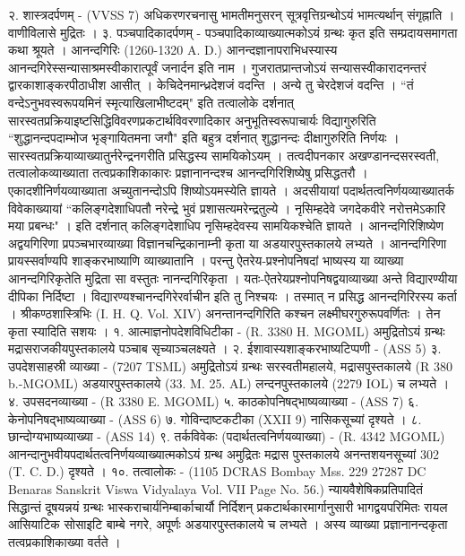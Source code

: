 २. शास्त्रदर्पणम् - (VVSS 7)
अधिकरणरचनासु भामतीमनुसरन् सूत्रवृत्तिग्रन्थोऽयं भामत्यर्थान् संगृह्नाति । वाणीविलासे मुद्रितः ।
३. पञ्चपादिकादर्पणम् - पञ्चपादिकाव्याख्यात्मकोऽयं ग्रन्थः कृत इति सम्प्रदायसमागता कथा श्रूयते ।
आनन्दगिरिः (1260-1320 A. D.)
आनन्दज्ञानापराभिधस्यास्य आनन्दगिरेस्सन्यासाश्रमस्वीकारात्पूर्वं जनार्दन इति नाम । गुजरातप्रान्तजोऽयं सन्यासस्वीकारादनन्तरं द्वारकाशाङ्करपीठाधीश आसीत् । केचिदेनमान्ध्रदेशजं वदन्ति । अन्ये तु चेरदेशजं वदन्ति ।
``तं वन्देऽनुभवस्वरूपयमिनं स्मृत्याखिलाभीष्टदम्" इति तत्वालोके दर्शनात् सारस्वतप्रक्रियाइष्टसिद्धिविवरणप्रकटार्थविवरणादिकार अनुभूतिस्वरूपाचार्यः विद्यागुरुरिति ``शुद्धानन्दपदाम्भोज भृङ्गायितमना जगौ" इति बहुत्र दर्शनात् शुद्धानन्दः दीक्षागुरुरिति निर्णयः ।
सारस्वतप्रक्रियाव्याख्यातुर्नरेन्द्रनगरीति प्रसिद्धस्य सामयिकोऽयम् । तत्वदीपनकार अखण्डानन्दसरस्वती, तत्वालोकव्याख्याता तत्वप्रकाशिकाकारः प्रज्ञानानन्दश्च आनन्दगिरिशिष्येषु प्रसिद्धतरौ । एकादशीनिर्णयव्याख्याता अच्युतानन्दोऽपि शिष्योऽयमस्येति ज्ञायते । अदसीयायां पदार्थतत्वनिर्णयव्याख्यातर्क विवेकाख्यायां ``कलिङ्गदेशाधिपतौ नरेन्द्रे भुवं प्रशासत्यमरेन्द्रतुल्ये । नृसिम्हदेवे जगदेकवीरे नरोत्तमेऽकारि मया प्रबन्धः" । इति दर्शनात् कलिङ्गदेशाधिप नृसिम्हदेवस्य सामयिकश्चेति ज्ञायते ।
आनन्दगिरिशिष्येण अद्वयगिरिणा प्रपञ्चभारव्याख्या विज्ञानचन्द्रिकानाम्नी कृता या अडयारपुस्तकालये लभ्यते ।
आनन्दगिरिणा प्रायस्सर्वाण्यपि शाङ्करभाष्याणि व्याख्यातानि । परन्तु ऐतरेय-प्रश्नोपनिषदां भाष्यस्य या व्याख्या आनन्दगिरिकृतेति मुद्रिता सा वस्तुतः नानन्दगिरिकृता । यतः-ऐतरेयप्रश्नोपनिषद्वयाव्याख्या अन्ते विद्यारण्यीया दीपिका निर्दिष्टा । विद्यारण्यश्चानन्दगिरेरर्वाचीन इति तु निश्चयः । तस्मात् न प्रसिद्ध आनन्दगिरिरस्य कर्ता । श्रीकण्ठशास्त्रिभिः (I. H. Q. Vol. XIV) अनन्तानन्दगिरिति कश्चन लक्ष्मीघरगुरुरूपवर्णितः । तेन कृता स्यादिति सशयः ।
१. आत्माज्ञनोपदेशविधिटीका - (R. 3380 H. MGOML) अमुद्रितोऽयं ग्रन्थः मद्रासराजकीयपुस्तकालये पञ्चाब सृच्याञ्चलक्ष्यते ।
२. ईशावास्यशाङ्करभाष्यटिप्पणी - (ASS 5)
३. उपदेशसाहस्री व्याख्या - (7207 TSML)
अमुद्रितोऽयं ग्रन्थः सरस्वतीमहालये, मद्रासपुस्तकालये (R 380 b.-MGOML) अडयारपुस्तकालये (33. M. 25. AL) लन्दनपुस्तकालये (2279 IOL) च लभ्यते ।
४. उपसदनव्याख्या - (R 3380 E. MGOML)
५. काठकोपनिषद्भाष्यव्याख्या - (ASS 7)
६. केनोपनिषद्भाष्यव्याख्या - (ASS 6)
७. गोविन्दाष्टकटीका (XXII 9) नासिकसूच्यां दृश्यते ।
८. छान्दोग्यभाष्यव्याख्या - (ASS 14)
९. तर्कविवेकः (पदार्थतत्वनिर्णयव्याख्या) - (R. 4342 MGOML)
आनन्दानुभवीयपदार्थतत्वनिर्णयव्याख्यात्मकोऽयं ग्रन्थ अमुद्रितः मद्रास पुस्तकालये अनन्तशयनसूच्यां 302 (T. C. D.) दृश्यते ।
१०. तत्वालोकः - (1105 DCRAS Bombay Mss. 229 27287 DC Benaras Sanskrit Viswa Vidyalaya Vol. VII Page No. 56.)
न्यायवैशेषिकप्रतिपादितं सिद्धान्तं दूषयन्नयं ग्रन्थः भास्कराचार्यनिम्बार्काचार्यौ निर्दिशन् प्रकटार्थकारमार्गानुसारी भागद्वयपरिमितः रायल आसियाटिक सोसाइटि बाम्बे नगरे, अपूर्णः अडयारपुस्तकालये च लभ्यते । अस्य व्याख्या प्रज्ञानानन्दकृता तत्वप्रकाशिकाख्या वर्तते ।

